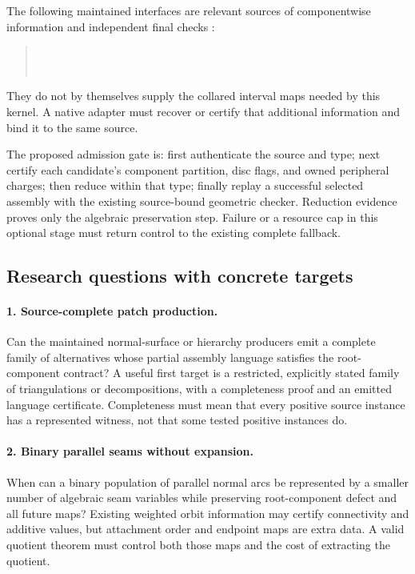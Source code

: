 \documentclass[11pt,letterpaper]{article}
\theoremstyle{definition}
\begin{document}
The following maintained interfaces are relevant sources of componentwise information and independent final checks \cite{weighted}:
\begin{quote}\small
{}\\
\\
\end{quote} They do not by themselves supply the collared interval maps needed by this kernel. A native adapter must recover or certify that additional information and bind it to the same source.

The proposed admission gate is: first authenticate the source and type; next certify each candidate's component partition, disc flags, and owned peripheral charges; then reduce within that type; finally replay a successful selected assembly with the existing source-bound geometric checker. Reduction evidence proves only the algebraic preservation step. Failure or a resource cap in this optional stage must return control to the existing complete fallback.

\subsection{Research questions with concrete targets}
\paragraph{1. Source-complete patch production.}
Can the maintained normal-surface or hierarchy producers emit a complete family of alternatives whose partial assembly language satisfies the root-component contract? A useful first target is a restricted, explicitly stated family of triangulations or decompositions, with a completeness proof and an emitted language certificate. Completeness must mean that every positive source instance has a represented witness, not that some tested positive instances do.

\paragraph{2. Binary parallel seams without expansion.}
When can a binary population of parallel normal arcs be represented by a smaller number of algebraic seam variables while preserving root-component defect and all future maps? Existing weighted orbit information may certify connectivity and additive values, but attachment order and endpoint maps are extra data. A valid quotient theorem must control both those maps and the cost of extracting the quotient.
\end{document}
